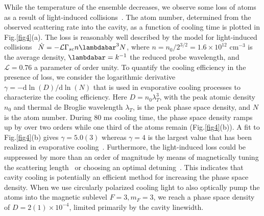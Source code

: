 \documentclass[aps,prl,superscriptaddress,onecloumn,nobibnotes]{revtex4-1}
\begin{document}
While the temperature of the ensemble decreases, we observe some loss of atoms as a result of light-induced collisions~\cite{burnett1996laser}. The atom number, determined from the observed scattering rate into the cavity, as a function of cooling time is plotted in Fig.\ref{fig4}(a). The loss is reasonably well described by the model for light-induced collisions~\cite{burnett1996laser} $\dot{N}=-\mathcal{L} \Gamma_{sc} n \lambdabar^3 N$, where $n=n_0/2^{3/2}=1.6\times 10^{12}$ cm$^{-3}$ is the average density, $\lambdabar=k^{-1}$ the reduced probe wavelength, and $\mathcal{L}=0.76$ a parameter of order unity. To quantify the cooling efficiency in the presence of loss, we consider the logarithmic derivative $\gamma=-\mathrm{d} \ln (D)/\mathrm{d} \ln (N)$ that is used in evaporative cooling processes to characterize the cooling efficiency. Here $D=n_0\lambda_T^3$, with the peak atomic density $n_0$ and thermal de Broglie wavelength $\lambda_T$, is the  peak phase space density, and $N$ is the atom number. During 80 ms cooling time, the phase space density ramps up by over two orders while one third of the atoms remain (Fig.\ref{fig4}(b)). A fit to Fig.\ref{fig4}(b) gives $\gamma=5.0(3)$ whereas $\gamma=4$ is the largest value that has been realized in evaporative cooling~\cite{evaporative}. Furthermore, the light-induced loss could be suppressed by more than an order of magnitude by means of magnetically tuning the scattering length~\cite{vuletic1999suppression} or choosing an optimal detuning~\cite{burnett1996laser}. This indicates that cavity cooling is potentially an efficient method for increasing the phase space density. When we use circularly polarized cooling light to also optically pump the atoms into the magnetic sublevel $F=3, m_F=3$, we reach a phase space density of $D=2(1)\times 10^{-4}$, limited primarily by the cavity linewidth. \par
 
%

\end{document}
